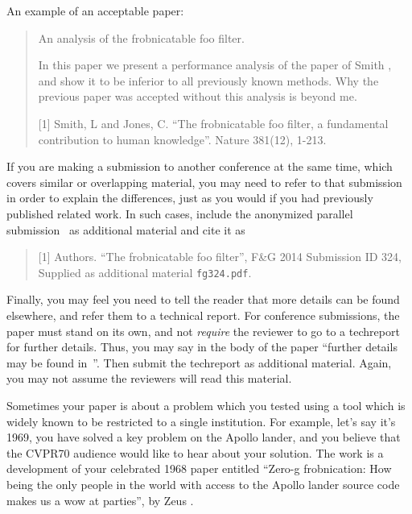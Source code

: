 \documentclass[10pt,twocolumn,letterpaper]{article}
\begin{document}
An example of an acceptable paper:

\begin{quote}
\begin{center}
     An analysis of the frobnicatable foo filter.
\end{center}

   In this paper we present a performance analysis of the
   paper of Smith \etal [1], and show it to be inferior to
   all previously known methods.  Why the previous paper
   was accepted without this analysis is beyond me.

   [1] Smith, L and Jones, C. ``The frobnicatable foo
   filter, a fundamental contribution to human knowledge''.
   Nature 381(12), 1-213.
\end{quote}

If you are making a submission to another conference at the same time,
which covers similar or overlapping material, you may need to refer to that
submission in order to explain the differences, just as you would if you
had previously published related work.  In such cases, include the
anonymized parallel submission~\cite{Authors14} as additional material and
cite it as
\begin{quote}
[1] Authors. ``The frobnicatable foo filter'', F\&G 2014 Submission ID 324,
Supplied as additional material {\tt fg324.pdf}.
\end{quote}

Finally, you may feel you need to tell the reader that more details can be
found elsewhere, and refer them to a technical report.  For conference
submissions, the paper must stand on its own, and not {\em require} the
reviewer to go to a techreport for further details.  Thus, you may say in
the body of the paper ``further details may be found
in~\cite{Authors14b}''.  Then submit the techreport as additional material.
Again, you may not assume the reviewers will read this material.

Sometimes your paper is about a problem which you tested using a tool which
is widely known to be restricted to a single institution.  For example,
let's say it's 1969, you have solved a key problem on the Apollo lander,
and you believe that the CVPR70 audience would like to hear about your
solution.  The work is a development of your celebrated 1968 paper entitled
``Zero-g frobnication: How being the only people in the world with access to
the Apollo lander source code makes us a wow at parties'', by Zeus \etal.
\end{document}
